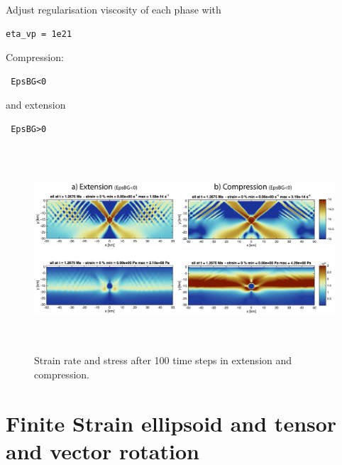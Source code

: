 \documentclass[12pt,english,openany]{scrbook}
\begin{document}
Adjust regularisation viscosity of each phase with
\begin{verbatim} 
eta_vp = 1e21
\end{verbatim}

Compression: \begin{verbatim} EpsBG<0 \end{verbatim}
and extension \begin{verbatim} EpsBG>0 \end{verbatim}

\begin{figure}[ht!]
\centerline{\includegraphics[height=3.0in]{./Figures/Extension_Compression_MDOODZ.png}}
\caption{Strain rate and stress after 100 time steps in extension and compression.}
\label{Extension_Compression_MDOODZ}
\end{figure}



\section{Finite Strain ellipsoid and tensor and vector rotation}
\end{document}
